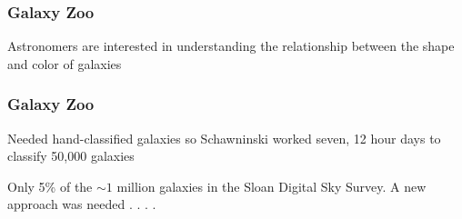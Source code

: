 \documentclass[aspectratio=169]{beamer}
\begin{document}
\begin{frame}
\frametitle{Galaxy Zoo}

Astronomers are interested in understanding the relationship between the shape and color of galaxies

\begin{figure}
  \centering
  \hspace{0in}
\end{figure}

\end{frame}
\begin{frame}
\frametitle{Galaxy Zoo}

Needed hand-classified galaxies so Schawninski worked seven, 12 hour days to classify 50,000 galaxies
\begin{center}
\end{center}
\pause
\vfill
Only 5\% of the $\sim1$ million galaxies in the Sloan Digital Sky Survey.  A new approach was needed . . . .
\end{frame}
\end{document}
